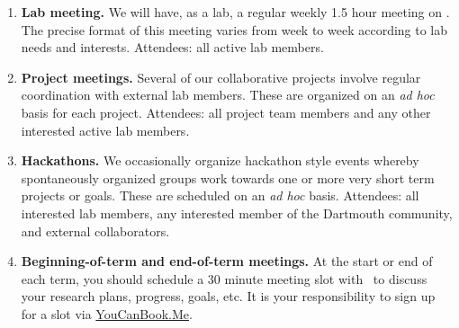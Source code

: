 \documentclass{tufte-book} %
\begin{document}
\begin{enumerate}
\item \textbf{Lab meeting.}  We will have, as a lab, a regular weekly
  1.5 hour meeting on \textbf{\labmeetingtime}.  The precise
  format of this meeting varies from week to week according to lab
  needs and interests. Attendees: all active lab members.

\item \textbf{Project meetings.}  Several of our collaborative
  projects involve regular coordination with external lab members.
  These are organized on an \textit{ad hoc} basis for each project.
  Attendees: all project team members and any other interested active
  lab members.

  \item \textbf{Hackathons.}  We occasionally organize hackathon
    style events whereby spontaneously organized groups work towards
    one or more very short term projects or goals.  These are
    scheduled on an \textit{ad hoc} basis.  Attendees: all interested
    lab members, any interested member of the Dartmouth community, and
    external collaborators.


  \item \textbf{Beginning-of-term and end-of-term meetings.} At the
    start or end of each term, you should schedule a 30 minute
    meeting slot with \director~to discuss your research
    plans, progress, goals, etc.  It is your responsibility to sign up
    for a slot via \href{https://context-lab.youcanbook.me/}{YouCanBook.Me}.


\end{enumerate}
\end{document}
